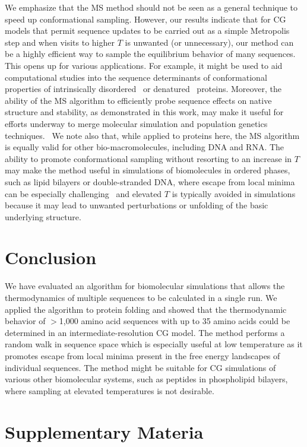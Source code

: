 \documentclass[
aip,
rsi,%
amsmath,amssymb,
reprint,%
]{revtex4-1}
\begin{document}
We emphasize that the MS method should not be seen as a general technique to speed up conformational sampling. However, our results indicate that for CG models that permit sequence updates to be carried out as a simple Metropolis step and when visits to higher $T$ is unwanted (or unnecessary), our method can be a highly efficient way to sample the equilibrium behavior of many sequences. {\color{red} This opens up for various applications. For example, it might be used to aid computational studies into the sequence determinants of conformational properties of intrinsically disordered~\cite{Das2013} or  denatured~\cite{Meng2013} proteins. Moreover, the ability of the MS algorithm to efficiently probe sequence effects on native structure and stability, as demonstrated in this work, may make it useful for efforts underway to merge molecular simulation and population genetics techniques.~\cite{Serohijos2014} We note also that, while applied to proteins here, the MS algorithm is equally valid for other bio-macromolecules, including DNA and RNA.} The ability to promote conformational sampling without resorting to an increase in $T$ may make the method useful in simulations of biomolecules in ordered phases, such as lipid bilayers or double-stranded DNA, where escape from local minima can be especially challenging~\cite{Bereau2015,Curuksu2009} and elevated $T$ is typically avoided in simulations because it may lead to unwanted perturbations or unfolding of the basic underlying structure.

\section{Conclusion}

We have evaluated an algorithm for biomolecular simulations that allows the thermodynamics of multiple  sequences to be calculated in a single run. We applied the algorithm to protein folding and showed that the thermodynamic behavior of $>$1,000 amino acid sequences with up to 35 amino acids could be determined in an intermediate-resolution CG model. The method performs a random walk in sequence space which is especially useful at low temperature as it promotes escape from local minima present in the free energy landscapes of individual sequences. The method might be suitable for CG simulations of {\color{red} various} other biomolecular systems, such as peptides in phospholipid bilayers, where sampling at elevated temperatures is not desirable. 

\section{Supplementary Materia} 
\end{document}

